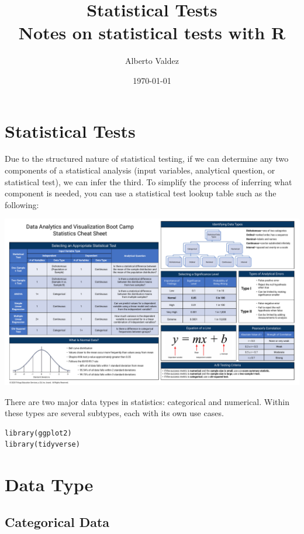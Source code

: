 \documentclass[11pt]{article}
\author{Alberto Valdez}
\date{\today}
\title{Statistical Tests\\\medskip
\large Notes on statistical tests with R}
\begin{document}
\maketitle
\tableofcontents


\section{Statistical Tests}
\label{sec:orgc7af203}

Due to the structured nature of statistical testing, if we can determine any two components of a statistical analysis (input variables, analytical question, or statistical test), we can infer the third. To simplify the process of inferring what component is needed, you can use a statistical test lookup table such as the following:

\begin{center}
\includegraphics[width=.9\linewidth]{./resources/Stats_Cheat_Sheet.pdf}
\end{center}

There are two major data types in statistics: categorical and numerical. Within these types are several subtypes, each with its own use cases.

\begin{verbatim}
library(ggplot2)
library(tidyverse)
\end{verbatim}

\section{Data Type}
\label{sec:orgeed7e94}

\subsection{Categorical Data}
\label{sec:orgca4f2e1}
\end{document}
